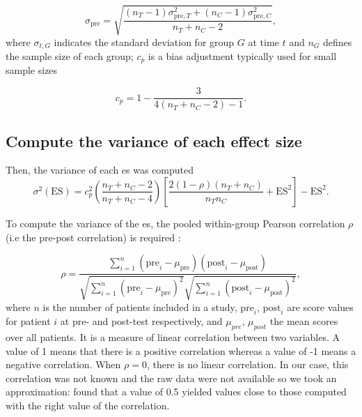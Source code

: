 \documentclass[12pt,a4paper,english]{article}
\begin{document}
\begin{equation}
\label{eq:stats_metareview_std_pre}
\sigma_{\text{pre}} = \sqrt{\frac{(n_T - 1)\sigma_{\text{pre},T}^2 + (n_C - 1)\sigma_{\text{pre},C}^2} {n_T + n_C - 2}},
\end{equation}
where $\sigma_{t,G}$ indicates the standard deviation for group $G$ at time $t$ and $n_G$ defines the sample size of each group; 
$c_p$ is a bias adjustment typically used for small sample sizes

\begin{equation}
\label{eq:metareview_correction_factor}
c_p =  1 - \frac{3} {4(n_T + n_C - 2) - 1}. 
\end{equation} 

\subsection{Compute the variance of each effect size}

Then, the variance of each \gls{es} was computed \citep{Morris2008}
\begin{equation}
\label{eq:metareview_variance_ES}
\sigma^2(\text{ES}) = c_p^2 \left (\frac{n_T + n_C - 2} {n_T + n_C - 4} \right ) \left  [ \frac{2(1-\rho)(n_T + n_C)} {n_Tn_C} + \text{ES}^2 \right ] - \text{ES}^2.
\end{equation} 

To compute the variance of the \gls{es}, the pooled within-group Pearson correlation $\rho$ (i.e the pre-post correlation) is required 
\citep{James2013}:

\begin{equation}
\label{eq:metareview_within_group_pearson_correlation}
\rho =  \frac{ \sum_{i=1}^{n} (\text{pre}_i - \mu_{\text{pre}})(\text{post}_i - \mu_{\text{post}}) } { \sqrt{ \sum_{i=1}^{n} (\text{pre}_i - \mu_{\text{pre}})^2} \sqrt{\sum_{i=1}^{n} (\text{post}_i - \mu_{\text{post}})^2} }, 
\end{equation}
where $n$ is the number of patients included in a study, $\text{pre}_i$, $\text{post}_i$ are score values for patient $i$ at pre- and post-test 
respectively, and $\mu_{pre}$, $\mu_{post}$ the mean scores over all patients. It is a measure of linear correlation between two variables. 
A value of 1 means that there is a positive correlation whereas a value of -1 means a negative correlation. When $\rho=0$, there is no
linear correlation. In our case, this correlation was not known and the raw data were not available so we took an
approximation: \citet{Balk2012} found that a value of 0.5 yielded values close to those computed with the right value of the correlation. 
\end{document}
